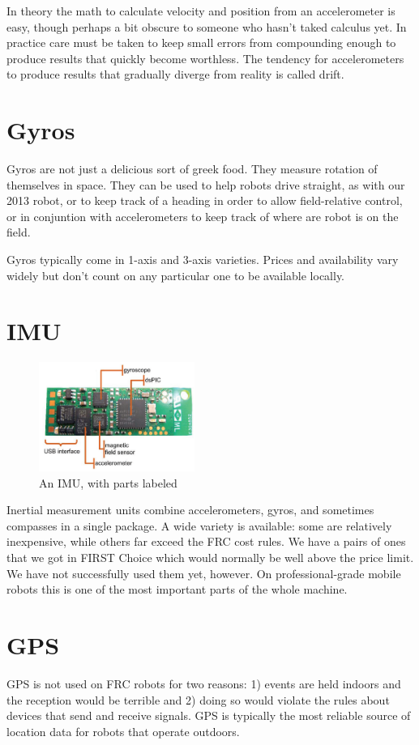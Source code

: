 \documentclass{article}
\begin{document}
In theory the math to calculate velocity and position from an accelerometer is easy, though perhaps a bit obscure to someone who hasn't taked calculus yet.  In practice care must be taken to keep small errors from compounding enough to produce results that quickly become worthless.  The tendency for accelerometers to produce results that gradually diverge from reality is called drift.  

\section{Gyros}
Gyros are not just a delicious sort of greek food.  They measure rotation of themselves in space.  They can be used to help robots drive straight, as with our 2013 robot, or to keep track of a heading in order to allow field-relative control, or in conjuntion with accelerometers to keep track of where are robot is on the field.  

Gyros typically come in 1-axis and 3-axis varieties.  Prices and availability vary widely but don't count on any particular one to be available locally.  

\section{IMU}
\begin{figure}[ht]
\centering
\includegraphics[width=2in]{imu.png}
\caption{An IMU, with parts labeled}
\end{figure}

Inertial measurement units combine accelerometers, gyros, and sometimes compasses in a single package.  A wide variety is available: some are relatively inexpensive, while others far exceed the FRC cost rules.  We have a pairs of ones that we got in FIRST Choice which would normally be well above the price limit.  We have not successfully used them yet, however.  On professional-grade mobile robots this is one of the most important parts of the whole machine.  

\section{GPS}
GPS is not used on FRC robots for two reasons: 1) events are held indoors and the reception would be terrible and 2) doing so would violate the rules about devices that send and receive signals.  GPS is typically the most reliable source of location data for robots that operate outdoors.  
\end{document}
